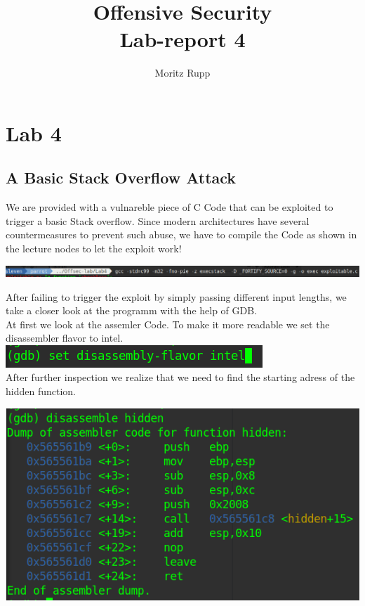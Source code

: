 \documentclass[a4paper,10pt]{article}
\title{Offensive Security\\Lab-report 4}
\author{Moritz Rupp}
\begin{document}
\maketitle


\newpage
\section{Lab 4}
\subsection{A Basic Stack Overflow Attack}
We are provided with a vulnareble piece of C Code that can be exploited to trigger a basic Stack overflow. Since modern architectures have several countermeasures to prevent such abuse, we have to compile the Code as shown in the lecture nodes to let the exploit work!
\begin{center}
 \includegraphics[scale=0.3]{gcc.png}
\end{center} 
After failing to trigger the exploit by simply passing different input lengths, we take a closer look at the programm with the help of GDB.\\
At first we look at the assemler Code. To make it more readable we set the disassembler flavor to intel. \includegraphics[scale=0.4]{intelfalvor.png}\\
After further inspection we realize that we need to find the starting adress of the hidden function.
\begin{center}
 \includegraphics[scale=0.5]{hidden.png}
\end{center}
\end{document}

